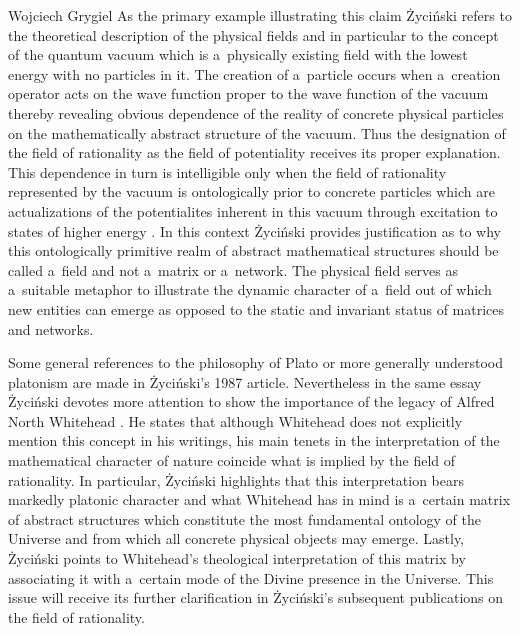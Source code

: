 \begin{artengenv}{Wojciech Grygiel}
As the primary example illustrating this claim Życiński refers to the theoretical description of the physical fields and in particular to the concept of the quantum vacuum which is a~physically existing field with the lowest energy with no particles in it. The creation of a~particle occurs when a~creation operator acts on the wave function proper to the wave function of the vacuum thereby revealing obvious dependence of the reality of concrete physical particles on the mathematically abstract structure of the vacuum. Thus the designation of the field of rationality as the field of potentiality receives its proper explanation. This dependence in turn is intelligible only when the field of rationality represented by the vacuum is ontologically prior to concrete particles which are actualizations of the potentialites inherent in this vacuum through excitation to states of higher energy
\parencite[][pp.176–178]{zycinski_filozoficzne_1987}. %
 In this context Życiński provides justification as to why this ontologically primitive realm of abstract mathematical structures should be called a~field and not a~matrix or a~network. The physical field serves as a~suitable metaphor to illustrate the dynamic character of a~field out of which new entities can emerge as opposed to the static and invariant status of matrices and networks.

Some general references to the philosophy of Plato or more generally understood platonism are made in Życiński's 1987 article. Nevertheless in the same essay Życiński devotes more attention to show the importance of the legacy of Alfred North Whitehead
\parencite[][pp.181–185]{zycinski_filozoficzne_1987}. %
 He states that although Whitehead does not explicitly mention this concept in his writings, his main tenets in the interpretation of the mathematical character of nature coincide what is implied by the field of rationality. In particular, Życiński highlights that this interpretation bears markedly platonic character and what Whitehead has in mind is a~certain matrix of abstract structures which constitute the most fundamental ontology of the Universe and from which all concrete physical objects may emerge. Lastly, Życiński points to Whitehead's theological interpretation of this matrix by associating it with a~certain mode of the Divine presence in the Universe. This issue will receive its further clarification in Życiński's subsequent publications on the field of rationality.


\end{artengenv}

